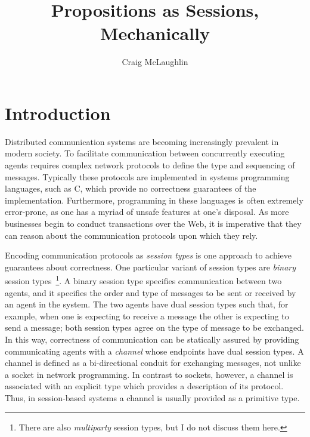 \documentclass{mpaper}
\begin{document}
\title{Propositions as Sessions, Mechanically}
\author{Craig McLaughlin}

\maketitle

\begin{abstract}
\begin{comment}
SPL (+CPL)

WTD

ROF

IMP
\end{comment}
\end{abstract}

\section{Introduction}\label{sec:intro}

Distributed communication systems are becoming increasingly prevalent in
modern society. To facilitate communication between concurrently executing
agents requires complex network protocols to define the type and sequencing of
messages. Typically these protocols are implemented in systems programming
languages, such as C, which provide no correctness guarantees of the
implementation. Furthermore, programming in these languages is often extremely
error-prone, as one has a myriad of unsafe features at one's disposal. As more
businesses begin to conduct transactions over the Web, it is imperative that
they can reason about the communication protocols upon which they rely.

Encoding communication protocols as \textit{session types} is one approach to
achieve guarantees about correctness. One particular variant of session types
are \textit{binary} session types~\footnote{There are also \textit{multiparty}
 session types, but I do not discuss them here.}. A binary session type
specifies communication between two agents, and it specifies the order and
type of messages to be sent or received by an agent in the system. The two
agents have dual session types such that, for example, when one is expecting
to receive a message the other is expecting to send a message; both session
types agree on the type of message to be exchanged. In this way, correctness
of communication can be statically assured by providing communicating agents
with a \textit{channel} whose endpoints have dual session types. A channel is
defined as a bi-directional conduit for exchanging messages, not unlike a
socket in network programming. In contrast to sockets, however, a channel is
associated with an explicit type which provides a description of its
protocol. Thus, in session-based systems a channel is usually provided as a
primitive type.
\end{document}

